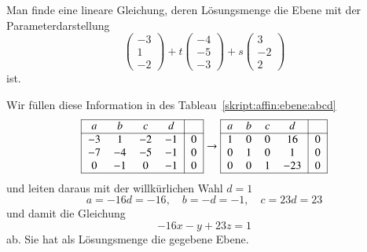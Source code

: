 \begin{beispiel}
Man finde eine lineare Gleichung, deren Lösungsmenge die Ebene mit der
Parameterdarstellung
\[
\begin{pmatrix}-3\\1\\-2\end{pmatrix}
+t
\begin{pmatrix}-4\\-5\\-3\end{pmatrix}
+s
\begin{pmatrix} 3\\-2\\ 2\end{pmatrix}
\]
ist.

\smallskip

{\parindent=0pt Wir} füllen diese Information in des Tableau~\eqref{skript:affin:ebene:abcd}
\[
\begin{tabular}{|
>{$}c<{$}
>{$}c<{$}
>{$}c<{$}
>{$}c<{$}|
>{$}c<{$}|}
\hline
a&b&c&d&\\
\hline
  -3&  1& -2& -1&  0\\
  -7& -4& -5& -1&  0\\
   0& -1&  0& -1&  0\\
\hline
\end{tabular}
\rightarrow
\begin{tabular}{|
>{$}c<{$}
>{$}c<{$}
>{$}c<{$}
>{$}c<{$}|
>{$}c<{$}|}
\hline
a&b&c&d&\\
\hline
    1&   0&   0&  16&  0\\
    0&   1&   0&   1&   0\\
    0&   0&   1& -23&   0\\
\hline
\end{tabular}
\]
und leiten daraus mit der willkürlichen Wahl $d=1$ 
\[
a=-16d=-16,
\quad
b=-d=-1,
\quad
c=23d=23
\]
und damit die Gleichung
\[
-16x-y+23z=1
\]
ab.
Sie hat als Lösungsmenge die gegebene Ebene.
\end{beispiel}

